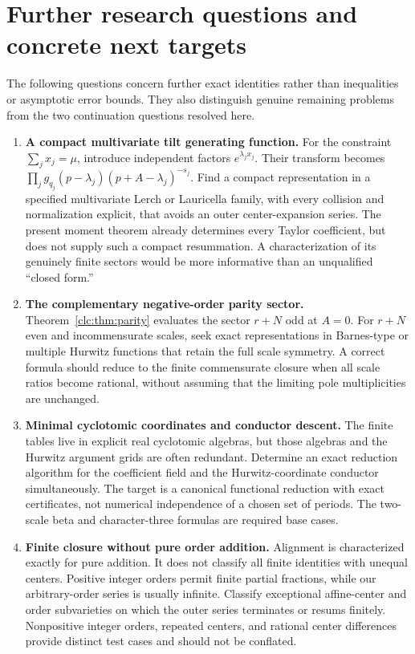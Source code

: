 \section{Further research questions and concrete next targets}
\label{clc:sec:questions}

The following questions concern further exact identities rather than
inequalities or asymptotic error bounds. They also distinguish genuine
remaining problems from the two continuation questions resolved here.

\begin{enumerate}[label=\textbf{Q\arabic*.},leftmargin=2.8em,itemsep=9pt]
\item \textbf{A compact multivariate tilt generating function.}
For the constraint $\sum_jx_j=\mu$, introduce independent factors
$e^{\lambda_jx_j}$. Their transform becomes
$\prod_jg_{q_j}(p-\lambda_j)(p+A-\lambda_j)^{-s_j}$.
Find a compact representation in a specified multivariate Lerch or
Lauricella family, with every collision and normalization explicit,
that avoids an outer center-expansion series. The present moment theorem
already determines every Taylor coefficient, but does not supply such
a compact resummation. A characterization of its genuinely finite
sectors would be more informative than an unqualified ``closed form.''

\item \textbf{The complementary negative-order parity sector.}
Theorem~\ref{clc:thm:parity} evaluates the sector $r+N$ odd at $A=0$.
For $r+N$ even and incommensurate scales, seek exact representations in
Barnes-type or multiple Hurwitz functions that retain the full scale
symmetry. A correct formula should reduce to the finite commensurate
closure when all scale ratios become rational, without assuming that
the limiting pole multiplicities are unchanged.

\item \textbf{Minimal cyclotomic coordinates and conductor descent.}
The finite tables live in explicit real cyclotomic algebras, but those
algebras and the Hurwitz argument grids are often redundant. Determine
an exact reduction algorithm for the coefficient field and the
Hurwitz-coordinate conductor simultaneously. The target is a canonical
functional reduction with exact certificates, not numerical independence
of a chosen set of periods. The two-scale beta and character-three
formulas are required base cases.

\item \textbf{Finite closure without pure order addition.}
Alignment is characterized exactly for pure addition. It does not
classify all finite identities with unequal centers. Positive integer
orders permit finite partial fractions, while our arbitrary-order
series is usually infinite. Classify exceptional affine-center and
order subvarieties on which the outer series terminates or resums
finitely. Nonpositive integer orders, repeated centers, and rational
center differences provide distinct test cases and should not be
conflated.


\end{enumerate}
